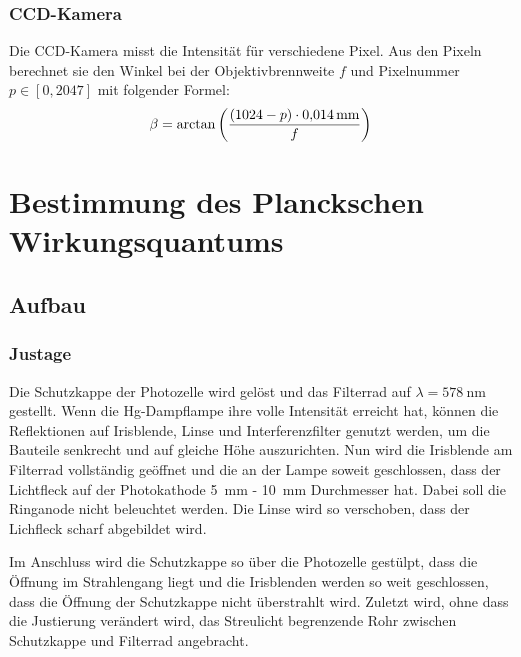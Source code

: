 \subsubsection{CCD-Kamera}

Die CCD-Kamera misst die Intensität für verschiedene Pixel. Aus den Pixeln
berechnet sie den Winkel bei der Objektivbrennweite $f$ und Pixelnummer $p \in
[0, 2047]$ mit folgender Formel:
\[
    \beta = \arctan\del{\frac{(1024 - p) \cdot \SI{0.014}{\milli\meter}}f}
\]


\FloatBarrier
\section{Bestimmung des Planckschen Wirkungsquantums}

\FloatBarrier
\subsection{Aufbau}

\begin{figure}[htbp]
    \centering
    \caption{%
        \cite[Abbildung~P402.1]{physik412-Anleitung}
    }
    \label{fig:P402.1}
\end{figure}

\FloatBarrier
\subsubsection{Justage}

Die Schutzkappe der Photozelle wird gelöst und das Filterrad auf $\lambda =
\SI{578}{\nano\meter}$ gestellt. Wenn die Hg-Dampflampe ihre volle Intensität
erreicht hat, können die Reflektionen auf Irisblende, Linse und
Interferenzfilter genutzt werden, um die Bauteile senkrecht und auf gleiche
Höhe auszurichten. Nun wird die Irisblende am Filterrad vollständig geöffnet
und die an der Lampe soweit geschlossen, dass der Lichtfleck auf der
Photokathode \SI{5}{\milli\meter} - \SI{10}{\milli\meter} Durchmesser hat.
Dabei soll die Ringanode nicht beleuchtet werden. Die Linse wird so verschoben,
dass der Lichfleck scharf abgebildet wird.

Im Anschluss wird die Schutzkappe so über die Photozelle gestülpt, dass
die Öffnung im Strahlengang liegt und die Irisblenden werden so weit
geschlossen, dass die Öffnung der Schutzkappe nicht überstrahlt wird.
Zuletzt wird, ohne dass die Justierung verändert wird, das Streulicht
begrenzende Rohr zwischen Schutzkappe und Filterrad angebracht.

